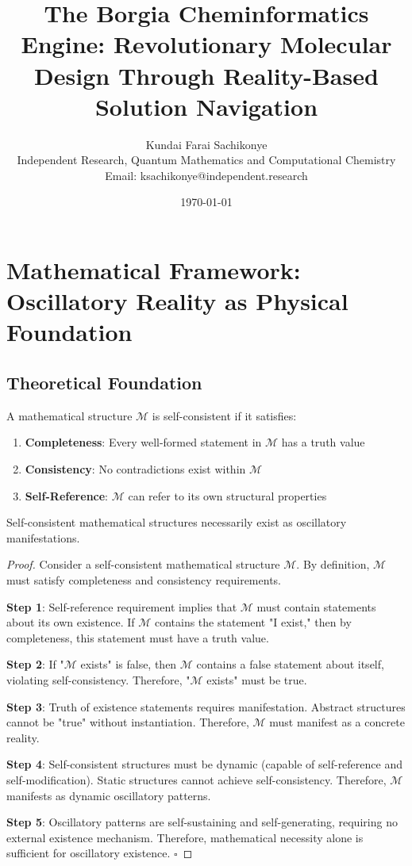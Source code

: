 \documentclass[11pt,a4paper]{article}
\title{The Borgia Cheminformatics Engine: Revolutionary Molecular Design Through Reality-Based Solution Navigation}
\author{Kundai Farai Sachikonye\\
Independent Research, Quantum Mathematics and Computational Chemistry\\
Email: ksachikonye@independent.research}
\date{\today}
\begin{document}
\maketitle


\section{Mathematical Framework: Oscillatory Reality as Physical Foundation}

\subsection{Theoretical Foundation}

\begin{definition}
A mathematical structure $\mathcal{M}$ is self-consistent if it satisfies:
\begin{enumerate}
\item \textbf{Completeness}: Every well-formed statement in $\mathcal{M}$ has a truth value
\item \textbf{Consistency}: No contradictions exist within $\mathcal{M}$
\item \textbf{Self-Reference}: $\mathcal{M}$ can refer to its own structural properties
\end{enumerate}
\end{definition}

\begin{theorem}
Self-consistent mathematical structures necessarily exist as oscillatory manifestations.
\end{theorem}

\begin{proof}
Consider a self-consistent mathematical structure $\mathcal{M}$. By definition, $\mathcal{M}$ must satisfy completeness and consistency requirements.

\textbf{Step 1}: Self-reference requirement implies that $\mathcal{M}$ must contain statements about its own existence. If $\mathcal{M}$ contains the statement "I exist," then by completeness, this statement must have a truth value.

\textbf{Step 2}: If "$\mathcal{M}$ exists" is false, then $\mathcal{M}$ contains a false statement about itself, violating self-consistency. Therefore, "$\mathcal{M}$ exists" must be true.

\textbf{Step 3}: Truth of existence statements requires manifestation. Abstract structures cannot be "true" without instantiation. Therefore, $\mathcal{M}$ must manifest as a concrete reality.

\textbf{Step 4}: Self-consistent structures must be dynamic (capable of self-reference and self-modification). Static structures cannot achieve self-consistency. Therefore, $\mathcal{M}$ manifests as dynamic oscillatory patterns.

\textbf{Step 5}: Oscillatory patterns are self-sustaining and self-generating, requiring no external existence mechanism. Therefore, mathematical necessity alone is sufficient for oscillatory existence. $\square$
\end{proof}
\end{document}
